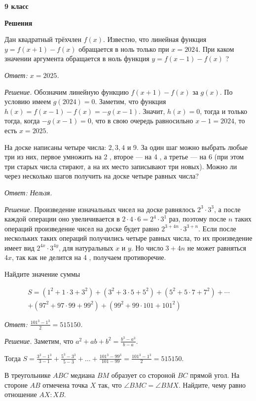\centerline{\bf \huge 9 класс}
\centerline{\bf \huge Решения}

Дан квадратный трёхчлен $f(x)$. Известно, что линейная функция $y= f(x+1)-f(x)$ обращается в ноль только при $x=2024$. При каком значении аргумента обращается в ноль функция $y=f(x-1)-f(x)$ ?

\textit{Ответ: $x=2025$.}

\textit{Решение.} 
Обозначим линейную функцию $f(x+1)-f(x)$ за $g(x)$. По условию имеем $g(2024)=0$. Заметим, что функция $h(x)=f(x-1)-f(x)=-g(x-1)$. Значит, $h(x)=0$, тогда и только тогда, когда $-g(x-1)=0$, что в свою очередь равносильно $x-1=2024$, то есть $x=2025$.

На доске написаны четыре числа: $2,3,4$ и 9. За один шаг можно выбрать любые три из них, первое умножить на 2 , второе --- на 4 , а третье --- на 6 (при этом три старых числа стирают, а на их место записывают три новых). Можно ли через несколько шагов получить на доске четыре равных числа?

\textit{Ответ: Нельзя.}

\textit{Решение.}
Произведение изначальных чисел на доске равнялось $2^3 \cdot 3^3$, а после каждой операции оно увеличивается в $2 \cdot 4 \cdot 6=2^4 \cdot 3^1$ раз, поэтому после $n$ таких операций произведение чисел на доске будет равно $2^{3+4 n} \cdot 3^{3+n}$. Если после нескольких таких операций получились четыре равных числа, то их произведение имеет вид $2^{4 x} \cdot 3^{4 y}$, для натуральных $x$ и $y$. Но число $3+4 n$ не может равняться $4 x$, так как не делится на 4 , получаем противоречие.

Найдите значение суммы

$$
\begin{gathered}
S=\left(1^2+1 \cdot 3+3^2\right)+\left(3^2+3 \cdot 5+5^2\right)+\left(5^2+5 \cdot 7+7^2\right)+\cdots \\
+\left(97^2+97 \cdot 99+99^2\right)+\left(99^2+99 \cdot 101+101^2\right)
\end{gathered}
$$

\textit{Ответ: $\frac{101^3-1^3}{2}=515150$.}

\textit{Решение.}
Заметим, что $a^2+a b+b^2=\frac{b^3-a^3}{b-a}$.

Тогда $S=\frac{3^3-1^3}{3-1}+\frac{5^3-3^3}{5-3}+\ldots+\frac{101^3-99^3}{101-99}=\frac{101^3-1^3}{2}=515150$.


В треугольнике $A B C$ медиана $B M$ образует со стороной $B C$ прямой угол. На стороне $A B$ отмечена точка $X$ так, что $\angle B M C=\angle B M X$. Найдите, чему равно отношение $A X: X B$.

